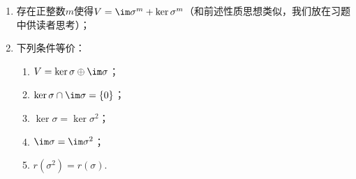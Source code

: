 \begin{enumerate}
\begin{proof}
\begin{enumerate}
                        这一点表明核空间随着线性变换的幂次增长而增长（至少不减），下面一点将说明这一不减序列一旦某个包含符号可以取等号，那么此后的项都相等.

                  \item 任取$k>0$，由（1）可知$\ker \sigma^{m+k}\subseteq\ker \sigma^{m+k+1}$，故只需证$\ker \sigma^{m+k+1}\subseteq\ker\sigma^{m+k}$. 事实上，设$\alpha\in\ker \sigma^{m+k+1}$，则$0=\sigma^{m+k+1}(\alpha)=\sigma^{m+1}(\sigma^k(\alpha))$，即$\sigma^k(\alpha)\in\ker\sigma^{m+1}$. 又$\ker \sigma^m=\ker \sigma^{m+1}$，则$\sigma^k(\alpha)\in\ker\sigma^m\implies\sigma^m(\sigma^k(\alpha))=0\implies\sigma^{m+k}(\alpha)=0\implies\alpha\in\ker\sigma^{m+k}$，故$\ker \sigma^{m+k+1}\subseteq\ker\sigma^{m+k}$，因此$\ker \sigma^{m+k+1}=\ker\sigma^{m+k}$，故$\ker \sigma^m=\ker \sigma^{m+1}=\ker \sigma^{m+2}=\ker \sigma^{m+3}=\cdots$.

                  \item 由上一点知我们只需证$\ker \sigma^n=\ker \sigma^{n+1}$. 反证法，若$\{0\}=\ker\sigma^0\subsetneqq\ker\sigma^1\subsetneqq\cdots\subsetneqq\ker\sigma^{n+1}$，则这一递增链条每处严格包含于的维数必然增加1，因此$\dim\ker\sigma^{n+1}\geqslant n+1>n$，但我们知道$\ker\sigma^{n+1}$是$V$的子空间，因此矛盾！故命题成立.
              \end{enumerate}
          \end{proof}
          对于像空间而言也有类似于\autoref{thm:6:核空间性质} 的定理，证明方法也是类似的，我们放在习题中供读者思考.

    \item 存在正整数$m$使得$V=\im \sigma^m+\ker\sigma^m$（和前述性质思想类似，我们放在习题中供读者思考）；

    \item 下列条件等价：
          \begin{enumerate}
              \item $V=\ker\sigma\oplus\im \sigma$；

              \item $\ker\sigma \cap \im \sigma=\{0\}$；

              \item $\ker\sigma=\ker\sigma^2$；

              \item $\im \sigma=\im \sigma^2$；

              \item $r(\sigma^2)=r(\sigma)$.
          \end{enumerate}


\end{enumerate}
